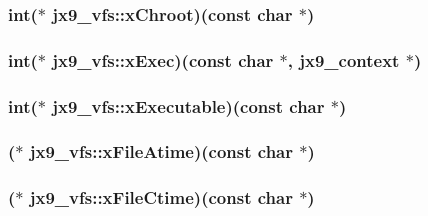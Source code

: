 \hypertarget{structjx9__vfs_a3227006c94d5ae22addc36918ec555c0}{
\subsubsection[{x\-Chroot}]{\setlength{\rightskip}{0pt plus 5cm}int($\ast$ jx9\-\_\-vfs\-::x\-Chroot)(const char $\ast$)}}\label{da/d75/structjx9__vfs_a3227006c94d5ae22addc36918ec555c0}
\hypertarget{structjx9__vfs_a3663a318c705c452c1c5f9ae4165a822}{
\subsubsection[{x\-Exec}]{\setlength{\rightskip}{0pt plus 5cm}int($\ast$ jx9\-\_\-vfs\-::x\-Exec)(const char $\ast$, {\bf jx9\-\_\-context} $\ast$)}}\label{da/d75/structjx9__vfs_a3663a318c705c452c1c5f9ae4165a822}
\hypertarget{structjx9__vfs_ac76b0d21ad0d70271a5f874fe38e42c5}{
\subsubsection[{x\-Executable}]{\setlength{\rightskip}{0pt plus 5cm}int($\ast$ jx9\-\_\-vfs\-::x\-Executable)(const char $\ast$)}}\label{da/d75/structjx9__vfs_ac76b0d21ad0d70271a5f874fe38e42c5}
\hypertarget{structjx9__vfs_a699b0f714ad21b50a83cf02789c861d8}{
\subsubsection[{x\-File\-Atime}]{($\ast$ jx9\-\_\-vfs\-::x\-File\-Atime)(const char $\ast$)}}\label{da/d75/structjx9__vfs_a699b0f714ad21b50a83cf02789c861d8}
\hypertarget{structjx9__vfs_a0d77a353ddc7c6aa456c2bbbedce120c}{
\subsubsection[{x\-File\-Ctime}]{($\ast$ jx9\-\_\-vfs\-::x\-File\-Ctime)(const char $\ast$)}}\label{da/d75/structjx9__vfs_a0d77a353ddc7c6aa456c2bbbedce120c}
